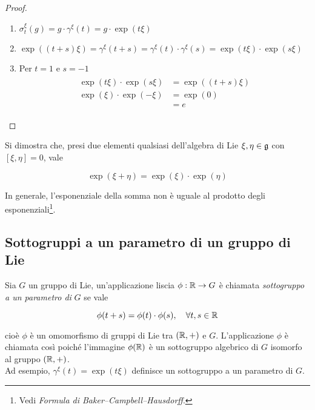 \begin{proof}\hfill\break
	\begin{enumerate}
		\item $ \sigma_{t}^{\xi}(g) = g \cdot \gamma^{\xi}(t) = g \cdot \exp(t \xi) $
		
		\item $ \exp((t+s) \xi) = \gamma^{\xi}(t+s) %
		= \gamma^{\xi}(t) \cdot \gamma^{\xi}(s) %
		= \exp(t \xi) \cdot \exp(s \xi) $
		
		\item Per $ t = 1 $ e $ s = -1 $
		\begin{align}
			\begin{split}
				\exp(t \xi) \cdot \exp(s \xi) &= \exp((t+s) \xi) \\
				\exp(\xi) \cdot \exp(-\xi) &= \exp(0) \\
				&= e
			\end{split}
		\end{align}
	\end{enumerate}
\end{proof}

\begin{remark}
	Si dimostra che, presi due elementi qualsiasi dell'algebra di Lie $ \xi,\eta \in \mathfrak{g} $ con $ [\xi,\eta] = 0 $, vale
	
	\begin{equation}
		\exp(\xi + \eta) = \exp(\xi) \cdot \exp(\eta)
	\end{equation}

	In generale, l'esponenziale della somma non è uguale al prodotto degli esponenziali\footnote{%
		Vedi \textit{Formula di Baker–Campbell–Hausdorff}.%
	}.
\end{remark}

\subsection{Sottogruppi a un parametro di un gruppo di Lie}

Sia $ G $ un gruppo di Lie, un'applicazione liscia $ \phi : \mathbb{R} \to G $ è chiamata \textit{sottogruppo a un parametro di} $ G $ se vale

\begin{equation}
	\phi(t+s) = \phi(t) \cdot \phi(s) \qcomma \forall t,s \in \R
\end{equation}

cioè $ \phi $ è un omomorfismo di gruppi di Lie tra $ (\mathbb{R},+) $ e $ G $. L'applicazione $ \phi $ è chiamata così poiché l'immagine $ \phi(\mathbb{R}) $ è un sottogruppo algebrico di $ G $ isomorfo al gruppo $ (\mathbb{R},+) $.\\
Ad esempio, $ \gamma^{\xi}(t) = \exp(t \xi) $ definisce un sottogruppo a un parametro di $ G $.

